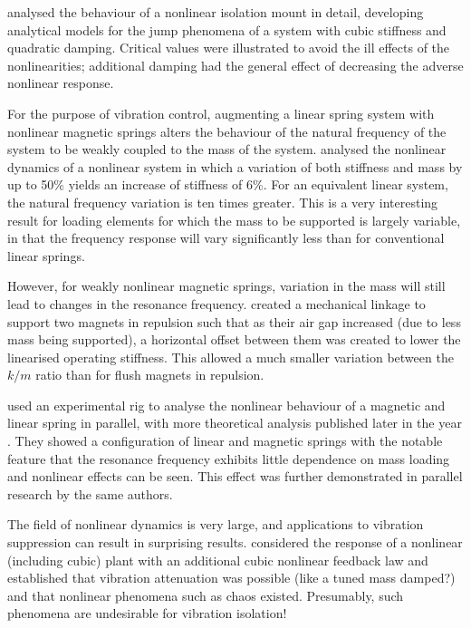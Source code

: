 \textcite{jazar2006} analysed the behaviour of a nonlinear isolation mount in
detail, developing analytical models for the jump phenomena of a system with
cubic stiffness and quadratic damping. Critical values were illustrated to
avoid the ill effects of the nonlinearities; additional damping had the
general effect of decreasing the adverse nonlinear response.

For the purpose of vibration control, augmenting a linear spring system with
nonlinear magnetic springs alters the behaviour of the natural frequency of
the system to be weakly coupled to the mass of the system.
\textcite{dangola2006} analysed the nonlinear dynamics of a nonlinear system
in which a variation of both stiffness and mass by up to 50\% yields an
increase of stiffness of 6\%. For an equivalent linear system, the natural
frequency variation is ten times greater. This is a very interesting result
for loading elements for which the mass to be supported is largely variable,
in that the frequency response will vary significantly less than for
conventional linear springs.

However, for weakly nonlinear magnetic springs, variation in the mass will
still lead to changes in the resonance frequency. \textcite{todaka2001}
created a mechanical linkage to support two magnets in repulsion such that as
their air gap increased (due to less mass being supported), a horizontal
offset between them was created to lower the linearised operating stiffness.
This allowed a much smaller variation between the $k/m$ ratio than for flush
magnets in repulsion.

\textcite{bonisoli2007} used an experimental rig to analyse the nonlinear
behaviour of a magnetic and linear spring in parallel, with more theoretical
analysis published later in the year \cite{bonisoli2007b}. They showed a
configuration of linear and magnetic springs with the notable feature that the
resonance frequency exhibits little dependence on mass loading and nonlinear
effects can be seen. This effect was further demonstrated in parallel research
by the same authors.

The field of nonlinear dynamics is very large, and applications to vibration
suppression can result in surprising results. \textcite{oueini1999} considered
the response of a nonlinear (including cubic) plant with an additional cubic
nonlinear feedback law and established that vibration attenuation was possible
(like a tuned mass damped?) and that nonlinear phenomena such as chaos
existed. Presumably, such phenomena are undesirable for vibration isolation!


